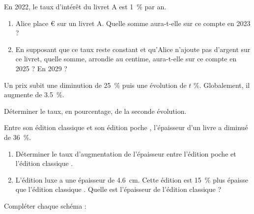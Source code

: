 \exo

En 2022, le taux d'intérêt du livret A est \SI{1}{\percent} par an.
\begin{enumerate}
\item Alice place  \euro{} sur un livret A. Quelle somme aura-t-elle sur ce compte en 2023 ?
\item En supposant que ce taux reste constant et qu'Alice n'ajoute pas d'argent sur ce livret, quelle somme, arrondie au centime, aura-t-elle sur ce compte en 2025 ? En 2029 ?
\end{enumerate}

\exo

Un prix subit une diminution de \SI{25}{\percent} puis une évolution de $t$ \si{\percent}. Globalement, il augmente de \SI{3,5}{\percent}.

Déterminer le taux, en pourcentage, de la seconde évolution.

\exo

Entre son édition \og classique \fg{}  et son édition \og poche \fg{}, l'épaisseur d'un livre a diminué de \SI{36}{\percent}.
\begin{enumerate}
\item Déterminer le taux d'augmentation de l'épaisseur entre l'édition \og poche \fg{} et l'édition \og classique \fg{}.
\item L'édition \og luxe \fg{} a une épaisseur de \SI{4,6}{\cm}. Cette édition est \SI{15}{\percent} plus épaisse que l'édition \og classique \fg{}. Quelle est l'épaisseur de l'édition \og classique \fg{} ?
\end{enumerate}

\exo

Compléter chaque schéma :
\begin{center}
\qquad
{}
\end{center}
\vspace{-6pt}

